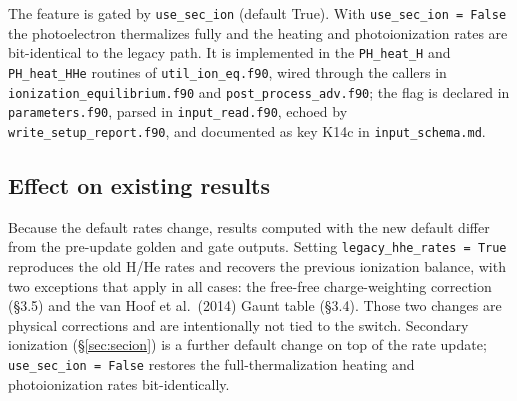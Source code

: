 \documentclass[english,a4paper]{my_memo}
\newcommand{\code}[1]{\texttt{#1}}
\begin{document}
The feature is gated by \code{use\_sec\_ion} (default True). With
\code{use\_sec\_ion = False} the photoelectron thermalizes fully and the
heating and photoionization rates are bit-identical to the legacy path. It is
implemented in the \code{PH\_heat\_H} and \code{PH\_heat\_HHe} routines of
\code{util\_ion\_eq.f90}, wired through the callers in
\code{ionization\_equilibrium.f90} and \code{post\_process\_adv.f90}; the flag
is declared in \code{parameters.f90}, parsed in \code{input\_read.f90}, echoed
by \code{write\_setup\_report.f90}, and documented as key K14c in
\code{input\_schema.md}.

\subsection{Effect on existing results}
Because the default rates change, results computed with the new default
differ from the pre-update golden and gate outputs. Setting
\code{legacy\_hhe\_rates = True} reproduces the old H/He rates and
recovers the previous ionization balance, with two exceptions that apply
in all cases: the free-free charge-weighting correction (\S3.5) and the
van Hoof et al.\ (2014) Gaunt table (\S3.4). Those two changes are
physical corrections and are intentionally not tied to the switch.
Secondary ionization (\S\ref{sec:secion}) is a further default change on top
of the rate update; \code{use\_sec\_ion = False} restores the
full-thermalization heating and photoionization rates bit-identically.
\end{document}
